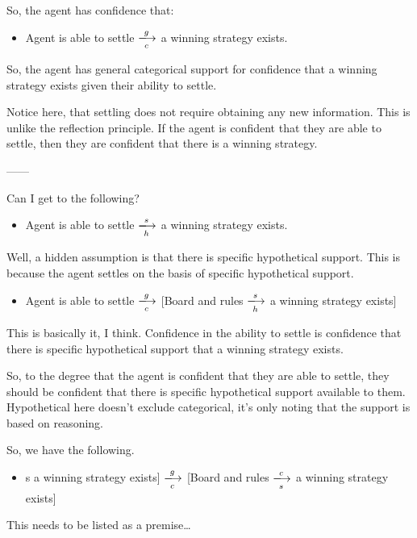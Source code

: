 \documentclass[10pt]{article}
\begin{document}
So, the agent has confidence that:

\begin{itemize}
\item Agent is able to settle \(\xlongrightarrow[c]{g}\) a winning strategy exists.
\end{itemize}

So, the agent has general categorical support for confidence that a winning strategy exists given their ability to settle.


Notice here, that settling does not require obtaining any new information.
This is unlike the reflection principle.
If the agent is confident that they are able to settle, then they are confident that there is a winning strategy.

------

Can I get to the following?

\begin{itemize}
\item Agent is able to settle \(\xlongrightarrow[h]{s}\) a winning strategy exists.
\end{itemize}

Well, a hidden assumption is that there is specific hypothetical support.
This is because the agent settles on the basis of specific hypothetical support.

\begin{itemize}
\item Agent is able to settle \(\xlongrightarrow[c]{g}\) [Board and rules \(\xlongrightarrow[h]{s}\) a winning strategy exists]
\end{itemize}

This is basically it, I think.
Confidence in the ability to settle is confidence that there is specific hypothetical support that a winning strategy exists.

So, to the degree that the agent is confident that they are able to settle, they should be confident that there is specific hypothetical support available to them.
Hypothetical here doesn't exclude categorical, it's only noting that the support is based on reasoning.

So, we have the following.

\begin{itemize}
\item[] [Board and rules \(\xlongrightarrow[h]{s}\) a winning strategy exists] \(\xlongrightarrow[c]{g}\) [Board and rules \(\xlongrightarrow[s]{c}\) a winning strategy exists]
\end{itemize}
{\color{red} This needs to be listed as a premise\dots}
\end{document}
